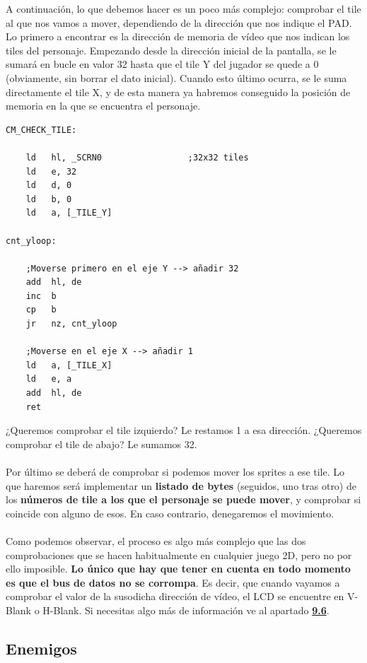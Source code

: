 A continuación, lo que debemos hacer es un poco más complejo: comprobar el tile al que nos vamos a mover, dependiendo de la dirección que nos indique el PAD. Lo primero a encontrar es la dirección de memoria de vídeo que nos indican los tiles del personaje. Empezando desde la dirección inicial de la pantalla, se le sumará en bucle en valor 32 hasta que el tile Y del jugador se quede a 0 (obviamente, sin borrar el dato inicial). Cuando esto último ocurra, se le suma directamente el tile X, y de esta manera ya habremos conseguido la posición de memoria en la que se encuentra el personaje.

\begin{lstlisting}[caption={Encontrar dirección de memoria del tile de personaje}, label={code:check_tile}]
CM_CHECK_TILE:

	ld 	 hl, _SCRN0 				;32x32 tiles
	ld 	 e, 32
	ld 	 d, 0
	ld 	 b, 0
	ld 	 a, [_TILE_Y] 				

cnt_yloop:

	;Moverse primero en el eje Y --> añadir 32
	add  hl, de
	inc  b
	cp   b
	jr 	 nz, cnt_yloop
	
	;Moverse en el eje X --> añadir 1
	ld 	 a, [_TILE_X]
	ld 	 e, a
	add  hl, de
	ret
\end{lstlisting}

¿Queremos comprobar el tile izquierdo? Le restamos 1 a esa dirección. ¿Queremos comprobar el tile de abajo? Le sumamos 32.
\\ \\
Por último se deberá de comprobar si podemos mover los sprites a ese tile. Lo que haremos será implementar un \textbf{listado de bytes} (seguidos, uno tras otro) de los \textbf{números de tile a los que el personaje se puede mover}, y comprobar si coincide con alguno de esos. En caso contrario, denegaremos el movimiento.
\\ \\
Como podemos observar, el proceso es algo más complejo que las dos comprobaciones que se hacen habitualmente en cualquier juego 2D, pero no por ello imposible. \textbf{Lo único que hay que tener en cuenta en todo momento es que el bus de datos no se corrompa}. Es decir, que cuando vayamos a comprobar el valor de la susodicha dirección de vídeo, el LCD se encuentre en V-Blank o H-Blank. Si necesitas algo más de información ve al apartado \textbf{\hyperref[anexo_gpu]{9.6}}.

\subsection{Enemigos}

